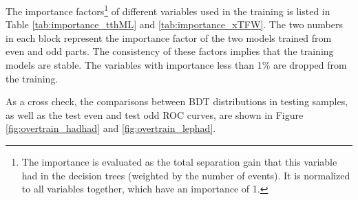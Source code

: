 The importance factors\footnote{
The importance is evaluated as the total separation gain that this variable had in the decision trees (weighted by the number of events). It is normalized to all variables together, which have an importance of 1.
}
of different variables used in the training is listed in Table \ref{tab:importance_tthML} and \ref{tab:importance_xTFW}. The two numbers in each block represent the importance factor of the two models trained from even and odd parts. The consistency of these factors implies that the training models are stable. The variables with importance less than 1\% are dropped from the training.



As a cross check, the comparisons between BDT distributions in testing samples, as well as the test even and test odd ROC curves, are shown in Figure \ref{fig:overtrain_hadhad} and \ref{fig:overtrain_lephad}.





